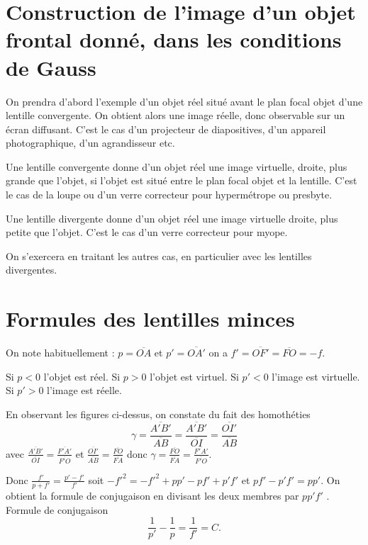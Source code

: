 \section{Construction de l'image d'un objet frontal donné, dans les conditions de Gauss}
\label{chap8-sec:constructionimagefrontal}

On prendra d'abord l'exemple d'un objet réel situé avant le plan focal objet d'une lentille convergente. On obtient alors une image réelle, donc observable sur un écran diffusant. C'est le cas d'un projecteur de diapositives, d'un appareil photographique, d'un agrandisseur etc.
%

Une lentille convergente donne d'un objet réel une image virtuelle, droite, plus grande que l'objet, si l'objet est situé entre le plan focal objet et la lentille. C'est le cas de la loupe ou d'un verre correcteur pour hypermétrope ou presbyte.

Une lentille divergente donne d'un objet  réel une image virtuelle droite, plus petite que l'objet. C'est le cas d'un verre correcteur pour myope.

On s'exercera en traitant les autres cas, en particulier avec les lentilles divergentes.

\section{Formules des lentilles minces}
\label{chap8-sec:formulesdeslentillesminces}
On note habituellement : $p=\overline{OA}$ et $p'=\overline{OA'}$ on a $f'=\overline{OF'}=\overline{FO}=-f$.

Si $p < 0$ l'objet est réel. Si $p > 0$ l'objet est virtuel. Si $p' < 0$ l'image est virtuelle. Si $p' > 0$ l'image est réelle.

En observant les figures ci-dessus, on constate du fait des homothéties
\begin{equation}
  \gamma = \frac{\overline{A'B'}}{\overline{AB}} = \frac{\overline{A'B'}}{\overline{OI}} = \frac{\overline{OI'}}{\overline{AB}}
\end{equation}
 avec $  \frac{\overline{A'B'}}{\overline{OI}} =  \frac{\overline{F'A'}}{\overline{F'O}}$ et $ \frac{\overline{OI'}}{\overline{AB}} = \frac{\overline{FO}}{\overline{FA}} $ donc $\gamma = \frac{\overline{FO}}{\overline{FA}} = \frac{\overline{F'A'}}{\overline{F'O}}$.

Donc $\frac{f'}{p+f'} = \frac{p'-f'}{f'}$ soit $-f'^2 = -f'^2 + pp' - pf' + p'f'$  et  $pf' - p'f' = pp'$. On obtient la formule de conjugaison en divisant les deux membres par $pp'f'$ .
Formule de conjugaison
\begin{equation}
  \frac{1}{p'} - \frac{1}{p} = \frac{1}{f'} = C.
\end{equation}

